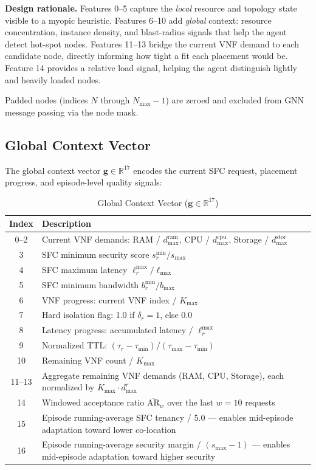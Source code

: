 \textbf{Design rationale.} Features 0--5 capture the \emph{local} resource and topology state visible to a myopic heuristic. Features 6--10 add \emph{global} context: resource concentration, instance density, and blast-radius signals that help the agent detect hot-spot nodes. Features 11--13 bridge the current VNF demand to each candidate node, directly informing how tight a fit each placement would be. Feature 14 provides a relative load signal, helping the agent distinguish lightly and heavily loaded nodes.

Padded nodes (indices $N$ through $N_{\max}-1$) are zeroed and excluded from GNN message passing via the node mask.

\subsection{Global Context Vector}

The global context vector $\mathbf{g} \in \mathbb{R}^{17}$ encodes the current SFC request, placement progress, and episode-level quality signals:

\begin{table}[!ht]
\centering
\caption{Global Context Vector ($\mathbf{g} \in \mathbb{R}^{17}$)}
\label{tab:global_context}
\begin{tabularx}{\textwidth}{c X}
\hline
\textbf{Index} & \textbf{Description} \\ \hline
0--2  & Current VNF demands: RAM / $d_{\max}^{\text{ram}}$, CPU / $d_{\max}^{\text{cpu}}$, Storage / $d_{\max}^{\text{stor}}$ \\
3     & SFC minimum security score $s_r^{\min} / s_{\max}$ \\
4     & SFC maximum latency $\ell_r^{\max} / \ell_{\max}$ \\
5     & SFC minimum bandwidth $b_r^{\min} / b_{\max}$ \\
6     & VNF progress: current VNF index / $K_{\max}$ \\
7     & Hard isolation flag: 1.0 if $\delta_r = 1$, else 0.0 \\
8     & Latency progress: accumulated latency / $\ell_r^{\max}$ \\
9     & Normalized TTL: $(\tau_r - \tau_{\min}) / (\tau_{\max} - \tau_{\min})$ \\
10    & Remaining VNF count / $K_{\max}$ \\
11--13 & Aggregate remaining VNF demands (RAM, CPU, Storage), each normalized by $K_{\max} \cdot d_{\max}^{r}$ \\
14    & Windowed acceptance ratio $\overline{\text{AR}}_w$ over the last $w = 10$ requests \\
15    & Episode running-average SFC tenancy / 5.0 --- enables mid-episode adaptation toward lower co-location \\
16    & Episode running-average security margin / $(s_{\max} - 1)$ --- enables mid-episode adaptation toward higher security \\
\hline
\end{tabularx}
\end{table}

